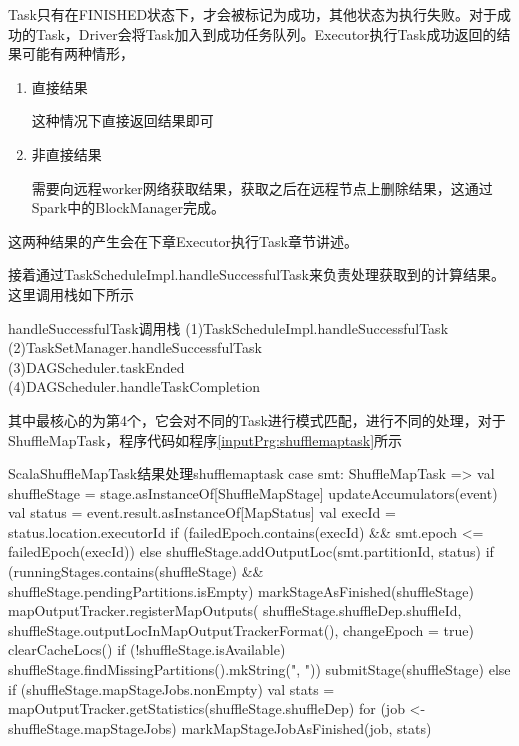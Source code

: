 Task只有在FINISHED状态下，才会被标记为成功，其他状态为执行失败。对于成功的Task，Driver会将Task加入到成功任务队列。Executor执行Task成功返回的结果可能有两种情形，
\begin{enumerate}[\bfseries 1]
    \item 直接结果
    
    这种情况下直接返回结果即可
    \item 非直接结果
    
    需要向远程worker网络获取结果，获取之后在远程节点上删除结果，这通过Spark中的BlockManager完成。
\end{enumerate}

这两种结果的产生会在下章Executor执行Task章节讲述。

接着通过TaskScheduleImpl.handleSuccessfulTask来负责处理获取到的计算结果。这里调用栈如下所示
\begin{centertitlebox}{handleSuccessfulTask调用栈}
	(1)TaskScheduleImpl.handleSuccessfulTask\\
	(2)TaskSetManager.handleSuccessfulTask\\
	(3)DAGScheduler.taskEnded\\
	(4)DAGScheduler.handleTaskCompletion
\end{centertitlebox}

其中最核心的为第4个，它会对不同的Task进行模式匹配，进行不同的处理，对于ShuffleMapTask，程序代码如程序\ref{inputPrg:shufflemaptask}所示
\begin{codeInput}{Scala}{ShuffleMapTask结果处理}{shufflemaptask}
case smt: ShuffleMapTask =>
  val shuffleStage = stage.asInstanceOf[ShuffleMapStage]
  updateAccumulators(event)
  val status = event.result.asInstanceOf[MapStatus]
  val execId = status.location.executorId
  if (failedEpoch.contains(execId) && smt.epoch <= failedEpoch(execId)) {
  } else {
    shuffleStage.addOutputLoc(smt.partitionId, status)
  }
  if (runningStages.contains(shuffleStage) && shuffleStage.pendingPartitions.isEmpty) {
    markStageAsFinished(shuffleStage)
    mapOutputTracker.registerMapOutputs(
    shuffleStage.shuffleDep.shuffleId,
    shuffleStage.outputLocInMapOutputTrackerFormat(),
    changeEpoch = true)	
    clearCacheLocs()	
    if (!shuffleStage.isAvailable) {
      shuffleStage.findMissingPartitions().mkString(", "))
      submitStage(shuffleStage)
    } else {
      if (shuffleStage.mapStageJobs.nonEmpty) {
        val stats = mapOutputTracker.getStatistics(shuffleStage.shuffleDep)
        for (job <- shuffleStage.mapStageJobs) {
          markMapStageJobAsFinished(job, stats)
        }
      }
    }
}
\end{codeInput}

